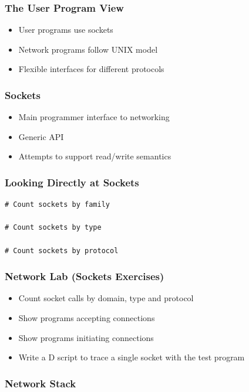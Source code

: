 \documentclass[pdftex]{beamer} %
\begin{document}
\begin{frame}
  \frametitle{The User Program View}
  \begin{itemize}
  \item User programs use sockets
  \item Network programs follow UNIX model
  \item Flexible interfaces for different protocols
  \end{itemize}
\end{frame}

\begin{frame}
  \frametitle{Sockets}
  \begin{itemize}
  \item Main programmer interface to networking
  \item Generic API
  \item Attempts to support read/write semantics
  \end{itemize}
\end{frame}

\begin{frame}[fragile]
  \frametitle{Looking Directly at Sockets}
\begin{verbatim}
# Count sockets by family

# Count sockets by type

# Count sockets by protocol
\end{verbatim}  
\end{frame}

\begin{frame}
  \frametitle{Network Lab (Sockets Exercises)}
  \begin{itemize}
  \item Count socket calls by domain, type and protocol
  \item Show programs accepting connections
  \item Show programs initiating connections
  \item Write a D script to trace a single socket with the test program
  \end{itemize}
\end{frame}

\begin{frame}
  \frametitle{Network Stack}
\end{frame}
\end{document}
